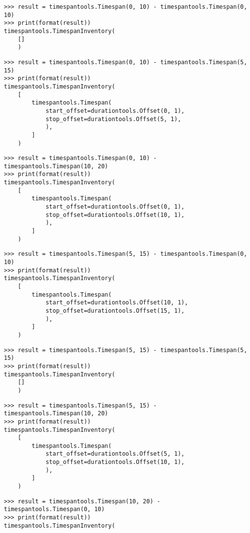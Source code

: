 \begin{abjadbookoutput}
\begin{singlespacing}
\vspace{-0.5\baselineskip}
\begin{lstlisting}
>>> result = timespantools.Timespan(0, 10) - timespantools.Timespan(0, 10)
>>> print(format(result))
timespantools.TimespanInventory(
    []
    )
\end{lstlisting}
\begin{lstlisting}
>>> result = timespantools.Timespan(0, 10) - timespantools.Timespan(5, 15)
>>> print(format(result))
timespantools.TimespanInventory(
    [
        timespantools.Timespan(
            start_offset=durationtools.Offset(0, 1),
            stop_offset=durationtools.Offset(5, 1),
            ),
        ]
    )
\end{lstlisting}
\begin{lstlisting}
>>> result = timespantools.Timespan(0, 10) - timespantools.Timespan(10, 20)
>>> print(format(result))
timespantools.TimespanInventory(
    [
        timespantools.Timespan(
            start_offset=durationtools.Offset(0, 1),
            stop_offset=durationtools.Offset(10, 1),
            ),
        ]
    )
\end{lstlisting}
\begin{lstlisting}
>>> result = timespantools.Timespan(5, 15) - timespantools.Timespan(0, 10)
>>> print(format(result))
timespantools.TimespanInventory(
    [
        timespantools.Timespan(
            start_offset=durationtools.Offset(10, 1),
            stop_offset=durationtools.Offset(15, 1),
            ),
        ]
    )
\end{lstlisting}
\begin{lstlisting}
>>> result = timespantools.Timespan(5, 15) - timespantools.Timespan(5, 15)
>>> print(format(result))
timespantools.TimespanInventory(
    []
    )
\end{lstlisting}
\begin{lstlisting}
>>> result = timespantools.Timespan(5, 15) - timespantools.Timespan(10, 20)
>>> print(format(result))
timespantools.TimespanInventory(
    [
        timespantools.Timespan(
            start_offset=durationtools.Offset(5, 1),
            stop_offset=durationtools.Offset(10, 1),
            ),
        ]
    )
\end{lstlisting}
\begin{lstlisting}
>>> result = timespantools.Timespan(10, 20) - timespantools.Timespan(0, 10)
>>> print(format(result))
timespantools.TimespanInventory(

\end{lstlisting}
\end{singlespacing}
\end{abjadbookoutput}
